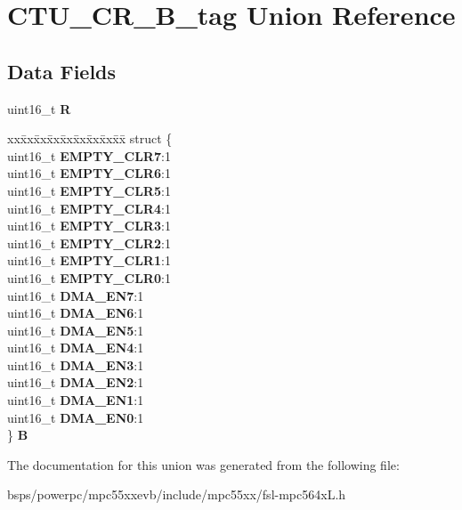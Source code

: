 \hypertarget{unionCTU__CR__16B__tag}{}\section{C\+T\+U\+\_\+\+C\+R\+\_\+B\+\_\+tag Union Reference}
\label{unionCTU__CR__16B__tag}
\subsection*{Data Fields}
\begin{DoxyCompactItemize}
\item 
\mbox{\label{unionCTU__CR__16B__tag_a8262e259f9a9fa73f121276bc32d174c}} 
uint16\+\_\+t {\bfseries R}
\item 
\mbox{\label{unionCTU__CR__16B__tag_a697923dc62c0aaa6e023b24e7f9a889b}} 
\begin{tabbing}
xx\=xx\=xx\=xx\=xx\=xx\=xx\=xx\=xx\=\kill
struct \{\\
\>uint16\_t {\bfseries EMPTY\_CLR7}:1\\
\>uint16\_t {\bfseries EMPTY\_CLR6}:1\\
\>uint16\_t {\bfseries EMPTY\_CLR5}:1\\
\>uint16\_t {\bfseries EMPTY\_CLR4}:1\\
\>uint16\_t {\bfseries EMPTY\_CLR3}:1\\
\>uint16\_t {\bfseries EMPTY\_CLR2}:1\\
\>uint16\_t {\bfseries EMPTY\_CLR1}:1\\
\>uint16\_t {\bfseries EMPTY\_CLR0}:1\\
\>uint16\_t {\bfseries DMA\_EN7}:1\\
\>uint16\_t {\bfseries DMA\_EN6}:1\\
\>uint16\_t {\bfseries DMA\_EN5}:1\\
\>uint16\_t {\bfseries DMA\_EN4}:1\\
\>uint16\_t {\bfseries DMA\_EN3}:1\\
\>uint16\_t {\bfseries DMA\_EN2}:1\\
\>uint16\_t {\bfseries DMA\_EN1}:1\\
\>uint16\_t {\bfseries DMA\_EN0}:1\\
\} {\bfseries B}\\

\end{tabbing}\end{DoxyCompactItemize}


The documentation for this union was generated from the following file\+:\begin{DoxyCompactItemize}
\item 
bsps/powerpc/mpc55xxevb/include/mpc55xx/fsl-\/mpc564x\+L.\+h\end{DoxyCompactItemize}
